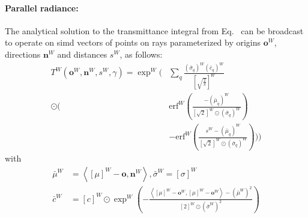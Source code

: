 \documentclass[a4paper, 11pt]{memoir}
\newcommand*{\erf}{\text{erf}}
\begin{document}
    \paragraph{Parallel \gls{radiance}:}
    \label{par:parallel_radiance}
    The analytical solution to the \gls{transmittance} integral from Eq.~ can be broadcast
    to operate on \gls{simd} vectors of points on rays parameterized by origins $\mathbf{o}^W$, directions $\mathbf{n}^W$
    and distances $s^W$, as follows:
    \begin{equation}
        \begin{aligned}
            T^W(\mathbf{o}^W, \mathbf{n}^W, s^W, \gamma) = \exp^W\Bigg(& \sum_q \frac{(\bar{\sigma}_q)^W
            (\bar{c}_q)^W}{\left[ \sqrt{\frac{2}{\pi}} \right]^W} \\
            \odot \Bigg(& \erf^W{\left( \frac{-(\bar{\mu}_q)^W}{[ \sqrt{2} ]^W \odot (\bar{\sigma}_q)^W} \right)}\\
            &- \erf^W{\left( \frac{s^W - (\bar{\mu}_q)^W}{[ \sqrt{2} ]^W \odot (\bar{\sigma}_q)^W} \right)} \Bigg) \Bigg) 
        \end{aligned}
        \label{eq:transmittance_broadcast}
    \end{equation}
    with
    \begin{align*}
        \bar{\mu}^W &= \left\langle [ \mu ]^W - \mathbf{o}, \mathbf{n}^W \right\rangle, \bar{\sigma}^W = \left[ \sigma \right]^W\\
        \bar{c}^W &= [c]^W \odot \exp^W{\left( - \frac{\left\langle [\mu]^W - \mathbf{o}^W, [\mu]^W - \mathbf{o}^W \right\rangle
    - \left(\bar{\mu}^W\right)^2}{[2]^W \odot \left(\bar{\sigma}^W\right)^2} \right)}
    \end{align*}
\end{document}
